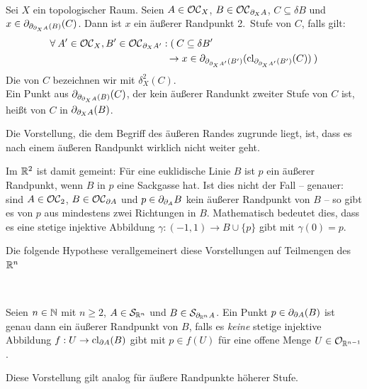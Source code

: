     \begin{dfn}\label{def:aeusserer-rand-2} \ \vspace{8pt}

        \noindent
        Sei $X$ ein topologischer Raum.
        Seien $A \in \mathcal{OC}_X$, $B \in \mathcal{OC}_{\partial_X A}$, $C \subseteq \delta B$ und $x \in \partial_{\partial_{\partial_X A}(B)}(C)$. Dann ist $x$ ein äußerer Randpunkt 2.~Stufe von $C$, falls gilt:
        \begin{align*}
            &\forall\: A' \in \mathcal{OC}_X, B' \in \mathcal{OC}_{\partial_X A'} : (\: C \subseteq \delta B'\\
            &\hphantom{XXXXXXXXXXXXX} \to x \in \partial_{\partial_{\partial_X A'}(B')}(\text{cl}_{\partial_{\partial_X A'}(B')} (C)) \:)
        \end{align*}
        Die  von $C$ bezeichnen wir mit $\delta_X^2(C)$.\\
        Ein Punkt aus $\partial_{\partial_{\partial_X A}(B)}(C)$, der kein äußerer Randunkt zweiter Stufe von $C$ ist, heißt  von $C$ in $\partial_{\partial_X A}(B)$.
    \end{dfn}
%    
    Die Vorstellung, die dem Begriff des äußeren Randes zugrunde liegt, ist, dass es nach einem äußeren Randpunkt \glqq wirklich nicht weiter geht\grqq.

    Im
    $\mathbb{R}^2$ ist damit gemeint:
    Für eine euklidische Linie $B$ ist $p$ ein äußerer Randpunkt, wenn $B$ in $p$ eine Sackgasse hat.
    Ist dies nicht der Fall -- genauer: sind $A \in \mathcal{OC}_2$, $B \in \mathcal{OC}_{\partial A}$ und $p \in \partial_{\partial_A} B$ kein äußerer Randpunkt von $B$ -- so gibt es von $p$ aus mindestens zwei Richtungen in $B$.
    Mathematisch bedeutet dies, dass es eine stetige injektive Abbildung $\gamma:(-1,1) \to B \cup \{p\}$ gibt mit $\gamma(0) = p$.

    Die
    folgende Hypothese verallgemeinert diese Vorstellungen auf Teilmengen des $\mathbb{R}^n$
%
    \begin{hyp}\label{hyp:aeusserer-rand} \ \vspace{8pt}

        \noindent
        Seien $n \in \mathbb{N}$ mit $n \geq 2$, $A \in \mathcal{S}_{\mathbb{R}^n}$ und $B \in \mathcal{S}_{\partial_{\mathbb{R}^n} A}$. Ein Punkt $p \in \partial_{\partial A}(B)$ ist genau dann ein äußerer Randpunkt von $B$, falls es \textit{keine} stetige injektive Abbildung $f : U \to \text{cl}_{\partial A}(B)$ gibt mit $p \in f(U)$ für eine offene Menge $U \in \mathcal{O}_{\mathbb{R}^{n-1}}$.
    \end{hyp}
%    
    Diese Vorstellung gilt analog für äußere Randpunkte höherer Stufe.
    
